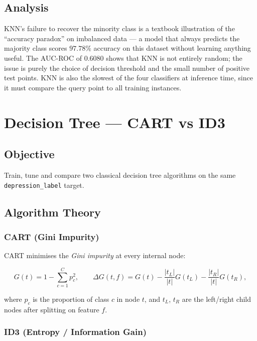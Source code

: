 \documentclass[11pt,a4paper]{article}
\begin{document}
\subsection{Analysis}
KNN's failure to recover the minority class is a textbook illustration of
the ``accuracy paradox'' on imbalanced data — a model that always predicts
the majority class scores $97.78\%$ accuracy on this dataset without
learning anything useful. The AUC-ROC of $0.6080$ shows that KNN is not
entirely random; the issue is purely the choice of decision threshold and
the small number of positive test points. KNN is also the slowest of the
four classifiers at inference time, since it must compare the query point
to all training instances.

\newpage
\section{Decision Tree — CART vs ID3}

\subsection{Objective}
Train, tune and compare two classical decision tree algorithms on the same
\texttt{depression\_label} target.

\subsection{Algorithm Theory}

\subsubsection{CART (Gini Impurity)}

CART minimises the \emph{Gini impurity} at every internal node:

\begin{equation}
    G(t) = 1 - \sum_{c=1}^{C} p_{c}^{2}, \qquad
    \Delta G(t, f) = G(t) - \frac{|t_{L}|}{|t|} G(t_{L}) - \frac{|t_{R}|}{|t|} G(t_{R}),
\end{equation}

where $p_c$ is the proportion of class $c$ in node $t$, and $t_L$,
$t_R$ are the left/right child nodes after splitting on feature $f$.

\subsubsection{ID3 (Entropy / Information Gain)}
\end{document}
